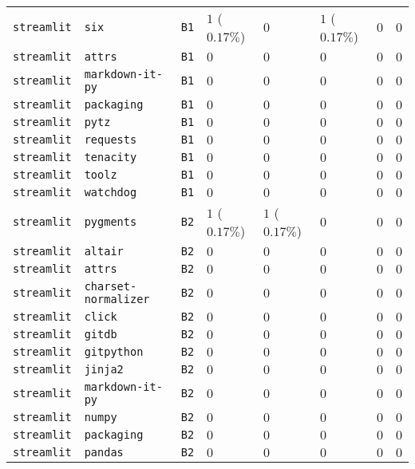 \begin{table}
\begin{tabular}{llllllll}
\texttt{streamlit} & \texttt{six} & \texttt{B1} & $1$ ($0.17\%$) & $0$ & $1$ ($0.17\%$) & $0$ & $0$ \\
\texttt{streamlit} & \texttt{attrs} & \texttt{B1} & $0$ & $0$ & $0$ & $0$ & $0$ \\
\texttt{streamlit} & \texttt{markdown-it-py} & \texttt{B1} & $0$ & $0$ & $0$ & $0$ & $0$ \\
\texttt{streamlit} & \texttt{packaging} & \texttt{B1} & $0$ & $0$ & $0$ & $0$ & $0$ \\
\texttt{streamlit} & \texttt{pytz} & \texttt{B1} & $0$ & $0$ & $0$ & $0$ & $0$ \\
\texttt{streamlit} & \texttt{requests} & \texttt{B1} & $0$ & $0$ & $0$ & $0$ & $0$ \\
\texttt{streamlit} & \texttt{tenacity} & \texttt{B1} & $0$ & $0$ & $0$ & $0$ & $0$ \\
\texttt{streamlit} & \texttt{toolz} & \texttt{B1} & $0$ & $0$ & $0$ & $0$ & $0$ \\
\texttt{streamlit} & \texttt{watchdog} & \texttt{B1} & $0$ & $0$ & $0$ & $0$ & $0$ \\
\texttt{streamlit} & \texttt{pygments} & \texttt{B2} & $1$ ($0.17\%$) & $1$ ($0.17\%$) & $0$ & $0$ & $0$ \\
\texttt{streamlit} & \texttt{altair} & \texttt{B2} & $0$ & $0$ & $0$ & $0$ & $0$ \\
\texttt{streamlit} & \texttt{attrs} & \texttt{B2} & $0$ & $0$ & $0$ & $0$ & $0$ \\
\texttt{streamlit} & \texttt{charset-normalizer} & \texttt{B2} & $0$ & $0$ & $0$ & $0$ & $0$ \\
\texttt{streamlit} & \texttt{click} & \texttt{B2} & $0$ & $0$ & $0$ & $0$ & $0$ \\
\texttt{streamlit} & \texttt{gitdb} & \texttt{B2} & $0$ & $0$ & $0$ & $0$ & $0$ \\
\texttt{streamlit} & \texttt{gitpython} & \texttt{B2} & $0$ & $0$ & $0$ & $0$ & $0$ \\
\texttt{streamlit} & \texttt{jinja2} & \texttt{B2} & $0$ & $0$ & $0$ & $0$ & $0$ \\
\texttt{streamlit} & \texttt{markdown-it-py} & \texttt{B2} & $0$ & $0$ & $0$ & $0$ & $0$ \\
\texttt{streamlit} & \texttt{numpy} & \texttt{B2} & $0$ & $0$ & $0$ & $0$ & $0$ \\
\texttt{streamlit} & \texttt{packaging} & \texttt{B2} & $0$ & $0$ & $0$ & $0$ & $0$ \\
\texttt{streamlit} & \texttt{pandas} & \texttt{B2} & $0$ & $0$ & $0$ & $0$ & $0$ \\

\end{tabular}
\end{table}
